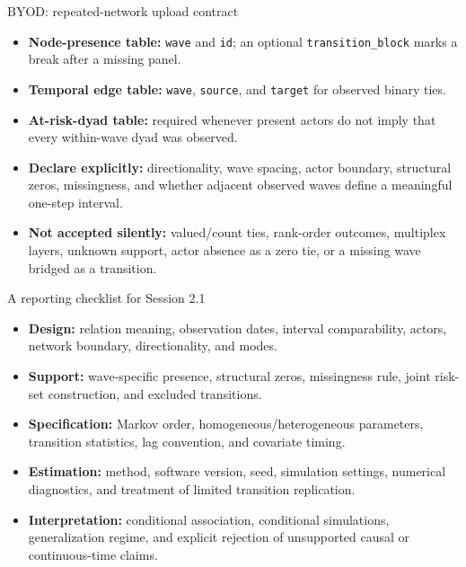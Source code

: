 \documentclass[aspectratio=169,11pt]{beamer}
\newcommand{\term}[1]{\textbf{\color{nupurple}#1}}
\begin{document}
\begin{frame}{BYOD: repeated-network upload contract}
\begin{itemize}
\item \term{Node-presence table:} \texttt{wave} and \texttt{id}; an optional \texttt{transition\_block} marks a break after a missing panel.
\item \term{Temporal edge table:} \texttt{wave}, \texttt{source}, and \texttt{target} for observed binary ties.
\item \term{At-risk-dyad table:} required whenever present actors do not imply that every within-wave dyad was observed.
\item \term{Declare explicitly:} directionality, wave spacing, actor boundary, structural zeros, missingness, and whether adjacent observed waves define a meaningful one-step interval.
\item \term{Not accepted silently:} valued/count ties, rank-order outcomes, multiplex layers, unknown support, actor absence as a zero tie, or a missing wave bridged as a transition.
\end{itemize}
\end{frame}

\begin{frame}{A reporting checklist for Session 2.1}
\begin{itemize}
\item \term{Design:} relation meaning, observation dates, interval comparability, actors, network boundary, directionality, and modes.
\item \term{Support:} wave-specific presence, structural zeros, missingness rule, joint risk-set construction, and excluded transitions.
\item \term{Specification:} Markov order, homogeneous/heterogeneous parameters, transition statistics, lag convention, and covariate timing.
\item \term{Estimation:} method, software version, seed, simulation settings, numerical diagnostics, and treatment of limited transition replication.
\item \term{Interpretation:} conditional association, conditional simulations, generalization regime, and explicit rejection of unsupported causal or continuous-time claims.
\end{itemize}
\end{frame}
\end{document}
